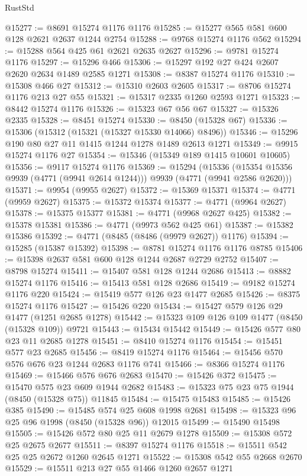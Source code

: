 \begin{lexlean}{RustStd}
\begin{coremodule}
@15277 := @8691 @15274 @1176 @1176
@15285 := @15277 @565 @581 @600 @128 @2621 @2637 @1244 @2754
@15288 := @9768 @15274 @1176 @562
@15294 := @15288 @564 @425 @61 @2621 @2635 @2627
@15296 := @9781 @15274 @1176
@15297 := @15296 @466
@15306 := @15297 @192 @27 @424 @2607 @2620 @2634 @1489 @2585 @1271
@15308 := @8387 @15274 @1176
@15310 := @15308 @466 @27
@15312 := @15310 @2603 @2605
@15317 := @8706 @15274 @1176 @213 @27 @55
@15321 := @15317 @2335 @1260 @2593 @1271
@15323 := @8442 @15274 @1176
@15326 := @15323 @67 @56 @67
@15327 := @15326 @2335
@15328 := @8451 @15274
@15330 := @8450 (@15328 @67)
@15336 := @15306 (@15312 (@15321 (@15327 @15330 @14066) @8496))
@15346 := @15296 @190 @80 @27 @11 @1415 @1244 @1278 @1489 @2613 @1271
@15349 := @9915 @15274 @1176 @27
@15354 := @15346 (@15349 @189 @1415 @10601 @10605)
@15356 := @9117 @15274 @1176
@15369 := @15294
    (@15336 (@15354 @15356 @9939 (@4771 (@9941 @2614 @1244))) @9939 (@4771 (@9941 @2586 @2620)))
@15371 := @9954 (@9955 @2627)
@15372 := @15369 @15371
@15374 := @4771 (@9959 @2627)
@15375 := @15372 @15374
@15377 := @4771 (@9964 @2627)
@15378 := @15375 @15377
@15381 := @4771 (@9968 @2627 @425)
@15382 := @15378 @15381
@15386 := @4771 (@9973 @562 @425 @61)
@15387 := @15382 @15386
@15392 := @4771 (@8485 (@8486 (@9979 @2627)) @1176)
@15394 := @15285 (@15387 @15392)
@15398 := @8781 @15274 @1176 @1176 @8785
@15406 := @15398 @2637 @581 @600 @128 @1244 @2687 @2729 @2752
@15407 := @8798 @15274
@15411 := @15407 @581 @128 @1244 @2686
@15413 := @8882 @15274 @1176
@15416 := @15413 @581 @128 @2686
@15419 := @9182 @15274 @1176 @220
@15424 := @15419 @577 @126 @23 @1477 @2685
@15426 := @8375 @15274 @1176
@15427 := @15426 @220
@15434 := @15427 @579 @126 @29 @1477 (@1251 @2685 @1278)
@15442 := @15323 @109 @126 @109 @1477 (@8450 (@15328 @109)) @9721
@15443 := @15434 @15442
@15449 := @15426 @577 @80 @23 @11 @2685 @1278
@15451 := @8410 @15274 @1176
@15454 := @15451 @577 @23 @2685
@15456 := @8419 @15274 @1176
@15464 := @15456 @570 @576 @676 @23 @1244 @2683 @1176 @741
@15466 := @8366 @15274 @1176
@15469 := @15466 @576 @676 @2683
@15470 := @15426 @372
@15475 := @15470 @575 @23 @609 @1944 @2682
@15483 := @15323 @75 @23 @75 @1944 (@8450 (@15328 @75)) @11845
@15484 := @15475 @15483
@15485 := @15426 @385
@15490 := @15485 @574 @25 @608 @1998 @2681
@15498 := @15323 @96 @25 @96 @1998 (@8450 (@15328 @96)) @12015
@15499 := @15490 @15498
@15505 := @15426 @572 @80 @25 @11 @2679 @1278
@15509 := @15308 @572 @25 @2675 @2677
@15511 := @8397 @15274 @1176
@15518 := @15511 @542 @25 @25 @2672 @1260 @2645 @1271
@15522 := @15308 @542 @55 @2668 @2670
@15529 := @15511 @213 @27 @55 @1466 @1260 @2657 @1271

\end{coremodule}
\end{lexlean}
